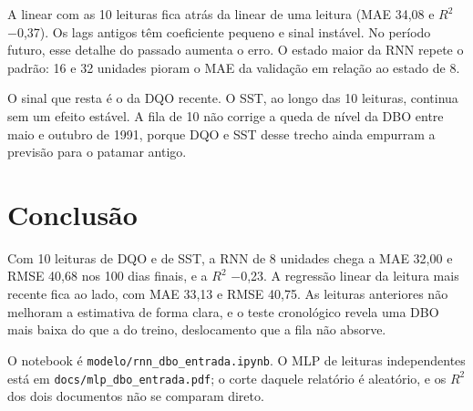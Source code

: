 \documentclass[11pt,a4paper]{article}
\begin{document}
A linear com as 10 leituras fica atrás da linear de uma leitura (MAE 34,08 e \(R^{2}\) $-$0,37). Os lags antigos têm coeficiente pequeno e sinal instável. No período futuro, esse detalhe do passado aumenta o erro. O estado maior da RNN repete o padrão: 16 e 32 unidades pioram o MAE da validação em relação ao estado de 8.

O sinal que resta é o da DQO recente. O SST, ao longo das 10 leituras, continua sem um efeito estável. A fila de 10 não corrige a queda de nível da DBO entre maio e outubro de 1991, porque DQO e SST desse trecho ainda empurram a previsão para o patamar antigo.

\section{Conclusão}

Com 10 leituras de DQO e de SST, a RNN de 8 unidades chega a MAE 32,00 e RMSE 40,68 nos 100 dias finais, e a \(R^{2}\) $-$0,23. A regressão linear da leitura mais recente fica ao lado, com MAE 33,13 e RMSE 40,75. As leituras anteriores não melhoram a estimativa de forma clara, e o teste cronológico revela uma DBO mais baixa do que a do treino, deslocamento que a fila não absorve.

O notebook é \texttt{modelo/rnn\_dbo\_entrada.ipynb}. O MLP de leituras independentes está em \texttt{docs/mlp\_dbo\_entrada.pdf}; o corte daquele relatório é aleatório, e os \(R^{2}\) dos dois documentos não se comparam direto.
\end{document}
